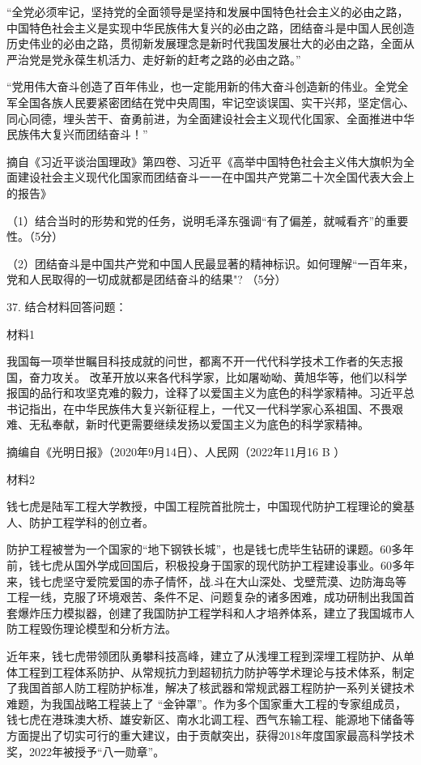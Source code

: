 \documentclass[UTF8,11pt]{ctexart}
\begin{document}
“全党必须牢记，坚持党的全面领导是坚持和发展中国特色社会主义的必由之路，中国特色社会主义是实现中华民族伟大复兴的必由之路，团结奋斗是中国人民创造历史伟业的必由之路，贯彻新发展理念是新时代我国发展壮大的必由之路，全面从严治党是党永葆生机活力、走好新的赶考之路的必由之路。”

“党用伟大奋斗创造了百年伟业，也一定能用新的伟大奋斗创造新的伟业。全党全军全国各族人民要紧密团结在党中央周围，牢记空谈误国、实干兴邦，坚定信心、同心同德，埋头苦干、奋勇前进，为全面建设社会主义现代化国家、全面推进中华民族伟大复兴而团结奋斗！”

摘自《习近平谈治国理政》第四卷、习近平《高举中国特色社会主义伟大旗帜为全面建设社会主义现代化国家而团结奋斗一一在中国共产党第二十次全国代表大会上的报告》

（1）结合当时的形势和党的任务，说明毛泽东强调“有了偏差，就喊看齐”的重要性。（5分）

（2）团结奋斗是中国共产党和中国人民最显著的精神标识。如何理解“一百年来，党和人民取得的一切成就都是团结奋斗的结果"? （5分）

37. 结合材料回答问题：

材料1

我国每一项举世瞩目科技成就的问世，都离不开一代代科学技术工作者的矢志报国，奋力攻关。 改革开放以来各代科学家，比如屠呦呦、黄旭华等，他们以科学报国的品行和攻坚克难的毅力，诠释了以爱国主义为底色的科学家精神。习近平总书记指出，在中华民族伟大复兴新征程上，一代又一代科学家心系祖国、不畏艰难、无私奉献，新时代更需要继续发扬以爱国主义为底色的科学家精神。

摘编自《光明日报》（2020年9月14日）、人民网（2022年11月16 B ）

材料2

钱七虎是陆军工程大学教授，中国工程院首批院士，中国现代防护工程理论的奠基人、防护工程学科的创立者。

防护工程被誉为一个国家的“地下钢铁长城”，也是钱七虎毕生钻研的课题。60多年前，钱七虎从国外学成回国后，积极投身于国家的现代防护工程建设事业。60多年来，钱七虎坚守爱院爱国的赤子情怀，战.斗在大山深处、戈壁荒漠、边防海岛等工程一线，克服了环境艰苦、条件不足、问题复杂的诸多困难，成功研制出我国首套爆炸压力模拟器，创建了我国防护工程学科和人才培养体系，建立了我国城市人防工程毁伤理论模型和分析方法。

近年来，钱七虎带领团队勇攀科技高峰，建立了从浅埋工程到深埋工程防护、从单体工程到工程体系防护、从常规抗力到超韧抗力防护等学术理论与技术体系，制定了我国首部人防工程防护标准，解决了核武器和常规武器工程防护一系列关键技术难题，为我国战略工程装上了 “金钟罩”。作为多个国家重大工程的专家组成员，钱七虎在港珠澳大桥、雄安新区、南水北调工程、西气东输工程、能源地下储备等方面提出了切实可行的重大建议，由于贡献突出，获得2018年度国家最高科学技术奖，2022年被授予“八一勋章”。
\end{document}
